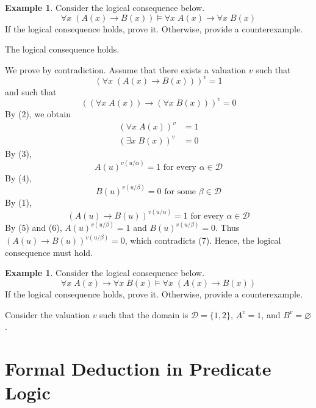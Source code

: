 \documentclass[11pt]{article}
\makeatletter
\theoremstyle{definition}
\newtheorem{exmp}[thm]{Example}
\newenvironment{pf}[1][\proofname]{\par
  \pushQED{\qed}%
  \normalfont \topsep0\p@\relax
  \trivlist
  \item[\hskip\labelsep\itshape
  #1\@addpunct{.}]\ignorespaces
}{%
  \popQED\endtrivlist\@endpefalse
}
\makeatother
\begin{document}
\begin{exmp}
Consider the logical consequence below.
$$\forall x \; (A(x) \rightarrow B(x)) \vDash \forall x \; A(x) \rightarrow \forall x \; B(x)$$
If the logical consequence holds, prove it. Otherwise, provide a counterexample.

The logical consequence holds.

\begin{pf}
We prove by contradiction. Assume that there exists a valuation $v$ such that
\begin{equation}
    (\forall x \; (A(x) \rightarrow B(x)))^v = 1
\end{equation}
and such that
\begin{equation}
    ((\forall x \; A(x)) \rightarrow (\forall x \; B(x)))^v = 0
\end{equation}
By (2), we obtain
\begin{align}
    (\forall x \; A(x))^v &= 1 \\
    (\exists x \; B(x))^v &= 0
\end{align}
By (3), 
\begin{equation}
    A(u)^{v(u/\alpha)} = 1 \text{ for every } \alpha \in \mathcal{D}
\end{equation}
By (4),
\begin{equation}
    B(u)^{v(u/\beta)} = 0 \text{ for some } \beta \in \mathcal{D}
\end{equation}
By (1), 
\begin{equation}
    (A(u) \rightarrow B(u))^{v(u/\alpha)} = 1 \text{ for every } \alpha \in \mathcal{D}
\end{equation}
By (5) and (6), $A(u)^{v(u/\beta)} = 1$ and $B(u)^{v(u/\beta)} = 0$. Thus $(A(u) \rightarrow B(u))^{v(u/\beta)} = 0$, which contradicts (7). Hence, the logical consequence must hold.
\end{pf}
\end{exmp}

\begin{exmp}
Consider the logical consequence below.
$$\forall x \; A(x) \rightarrow \forall x \; B(x) \vDash \forall x \; (A(x) \rightarrow B(x))$$
If the logical consequence holds, prove it. Otherwise, provide a counterexample.

Consider the valuation $v$ such that the domain is $\mathcal{D} = \{1, 2\}$, $A^v = 1$, and $B^v = \varnothing$. 
\end{exmp}

\newpage
\section{Formal Deduction in Predicate Logic}
\end{document}
